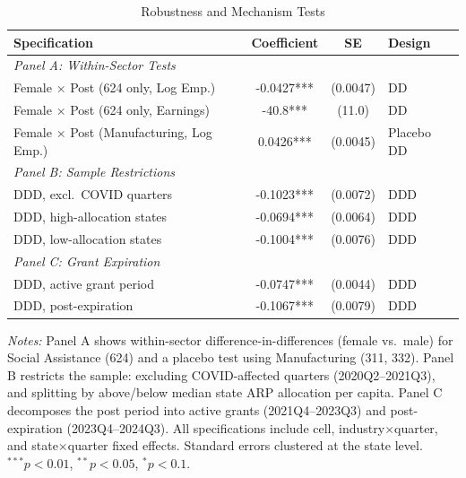 \begin{table}[htbp]
\centering
\caption{Robustness and Mechanism Tests}
\label{tab:robust}
\begin{tabular}{lccl}
\toprule
Specification & Coefficient & SE & Design \\
\midrule
\multicolumn{4}{l}{\textit{Panel A: Within-Sector Tests}} \\[3pt]
Female $\times$ Post (624 only, Log Emp.) & -0.0427*** & (0.0047) & DD \\
Female $\times$ Post (624 only, Earnings) & -40.8*** & (11.0) & DD \\
Female $\times$ Post (Manufacturing, Log Emp.) & 0.0426*** & (0.0045) & Placebo DD \\
\midrule
\multicolumn{4}{l}{\textit{Panel B: Sample Restrictions}} \\[3pt]
DDD, excl.\ COVID quarters & -0.1023*** & (0.0072) & DDD \\
DDD, high-allocation states & -0.0694*** & (0.0064) & DDD \\
DDD, low-allocation states & -0.1004*** & (0.0076) & DDD \\
\midrule
\multicolumn{4}{l}{\textit{Panel C: Grant Expiration}} \\[3pt]
DDD, active grant period & -0.0747*** & (0.0044) & DDD \\
DDD, post-expiration & -0.1067*** & (0.0079) & DDD \\
\bottomrule
\end{tabular}
\begin{tablenotes}[flushleft]
\small
\item \textit{Notes:} Panel A shows within-sector difference-in-differences (female vs.\ male) for Social Assistance (624) and a placebo test using Manufacturing (311, 332). Panel B restricts the sample: excluding COVID-affected quarters (2020Q2--2021Q3), and splitting by above/below median state ARP allocation per capita. Panel C decomposes the post period into active grants (2021Q4--2023Q3) and post-expiration (2023Q4--2024Q3). All specifications include cell, industry$\times$quarter, and state$\times$quarter fixed effects. Standard errors clustered at the state level. $^{***}p<0.01$, $^{**}p<0.05$, $^{*}p<0.1$.
\end{tablenotes}
\end{table}
